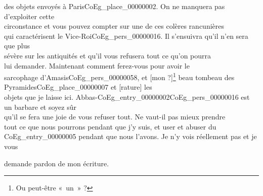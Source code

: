 \documentclass{book}
\begin{document}
des objets envoyés à Paris\gls{CoEg_place_00000002}. On ne manquera pas d’exploiter cette\\
circonstance et vous pouvez compter sur une de ces colères rancunières\\
qui caractérisent le Vice-Roi\gls{CoEg_pers_00000016}. Il s’ensuivra qu’il n’en sera que plus\\
sévère sur les antiquités et qu’il vous refusera tout ce qu’on pourra\\
lui demander. Maintenant comment ferez-vous pour avoir le\\
sarcophage d’Amasis\gls{CoEg_pers_00000058}, et {[mon ?]}\footnote{Ou peut-être «~un~» ?} beau tombeau des Pyramides\gls{CoEg_place_00000007} et [rature] les\\
objets que je laisse ici. Abbas-\Gls{CoEg_entry_00000002}\gls{CoEg_pers_00000016} est un barbare et soyez sûr\\
qu’il se fera une joie de vous refuser tout. Ne vaut-il pas mieux prendre\\
tout ce que nous pourrons pendant que j’y suis, et user et abuser du\\
\gls{CoEg_entry_00000005} pendant que nous l’avons. Je n’y vois réellement pas et je vous
\begin{flushright}demande pardon de mon écriture.\end{flushright}
\hypertarget{CoEg_Mariette_1853-08-28}{}
\end{document}
